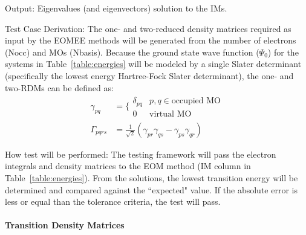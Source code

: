 \documentclass[12pt, titlepage]{article}
\begin{document}
\begin{enumerate}
	Output: Eigenvalues (and eigenvectors) solution to the IMs.
	
	Test Case Derivation: 
	The one- and two-reduced density matrices required  as input by the EOMEE 
	methods will be generated from the number of electrons (Nocc) and MOs 
	(Nbasis). Because the ground state wave function ($\Psi_0$) for the 
	systems in Table~\ref{table:energies} will be modeled 	by a single Slater 
	determinant (specifically the lowest energy Hartree-Fock Slater 
	determinant), the one- and two-RDMs can be defined as:
	\begin{align*}
	\gamma_{pq} &=\Bigg\{
	\begin{matrix}
	\delta_{pq}& p,q \in \text{occupied MO}\\
	0 & \text{virtual MO}
	\end{matrix}\\
	\Gamma_{pqrs} &= \frac{1}{\sqrt{2}}(\gamma_{pr}\gamma_{qs} - 
	\gamma_{ps}\gamma_{qr})
	\end{align*} 
	
	How test will be performed:
	The testing framework will pass the electron integrals and density matrices 
	to the EOM method (IM column in Table~\ref{table:energies}). From the 
	solutions, the lowest transition energy will be determined and compared 
	against the ``expected" value. If the absolute error is less or 
	equal than the tolerance criteria, the test will pass.

	
\end{enumerate}


\paragraph{Transition Density Matrices}
\end{document}
